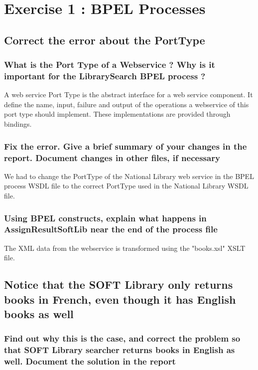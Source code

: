 \section{Exercise 1 : BPEL Processes}

\subsection{Correct the error about the PortType}
    \subsubsection{What is the Port Type of a Webservice ? Why is it important for the LibrarySearch BPEL process ?}
    A web service Port Type is the abstract interface for a web service component. It define the name, input, failure and output of the operations a webservice of this port type should implement. These implementations are provided through bindings.

    \subsubsection{Fix the error. Give a brief summary of your changes in the report. Document changes in other files, if necessary}

    We had to change the PortType of the National Library web service in the BPEL process WSDL file to the correct PortType used in the National Library WSDL file.

    \subsubsection{Using BPEL constructs, explain what happens in AssignResultSoftLib near the end of the process file}
    The XML data from the webservice is transformed using the "books.xsl" XSLT file.

\subsection{Notice that the SOFT Library only returns books in French, even though it has English books as well}

    \subsubsection{Find out why this is the case, and correct the problem so that SOFT Library searcher returns books in English as well. Document the solution in the
    report}

